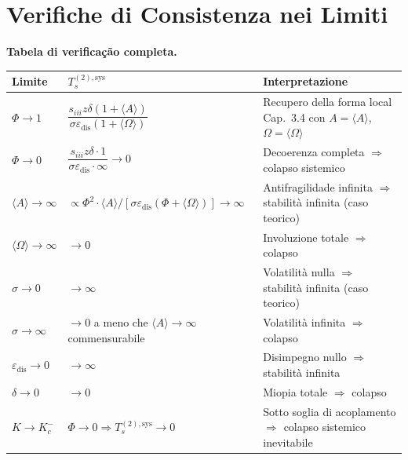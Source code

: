 \section{Verifiche di Consistenza nei
Limiti}\label{verifiche-di-consistenza-nei-limiti}

\Proved{} \textbf{Tabela di verificação completa.}

{\def\LTcaptype{none} %
{\small\begin{longtable}[]{@{}
  >{\raggedright\arraybackslash}p{}
  >{\raggedright\arraybackslash}p{}
  >{\raggedright\arraybackslash}p{}@{}}
\toprule\noalign{}
\begin{minipage}[b]{\linewidth}\raggedright
Limite
\end{minipage} & \begin{minipage}[b]{\linewidth}\raggedright
\(T_s^{(2),\text{sys}}\)
\end{minipage} & \begin{minipage}[b]{\linewidth}\raggedright
Interpretazione
\end{minipage} \\
\midrule\noalign{}
\endhead
\bottomrule\noalign{}
\endlastfoot
\(\Phi \to 1\) &
\(\dfrac{s_{iii}z\delta(1+\langle A\rangle)}{\sigma\varepsilon_{\text{dis}}(1+\langle\Omega\rangle)}\)
& Recupero della forma local Cap.~3.4 con \(A=\langle A\rangle\),
\(\Omega=\langle\Omega\rangle\) \Proved{} \\
\(\Phi \to 0\) &
\(\dfrac{s_{iii}z\delta \cdot 1}{\sigma\varepsilon_{\text{dis}} \cdot \infty} \to 0\)
& Decoerenza completa \(\Rightarrow\) colapso sistemico \Proved{} \\
\(\langle A\rangle \to \infty\) &
\(\propto \Phi^2 \cdot \langle A\rangle / [\sigma\varepsilon_{\text{dis}}(\Phi+\langle\Omega\rangle)] \to \infty\)
& Antifragilidade infinita \(\Rightarrow\) stabilità infinita (caso
teorico) \Proved{} \\
\(\langle\Omega\rangle \to \infty\) & \(\to 0\) & Involuzione totale
\(\Rightarrow\) colapso \Proved{} \\
\(\sigma \to 0\) & \(\to \infty\) & Volatilità nulla \(\Rightarrow\)
stabilità infinita (caso teorico) \Proved{} \\
\(\sigma \to \infty\) & \(\to 0\) a meno che
\(\langle A\rangle \to \infty\) commensurabile & Volatilità infinita
\(\Rightarrow\) colapso \Proved{} \\
\(\varepsilon_{\text{dis}} \to 0\) & \(\to \infty\) & Disimpegno nullo
\(\Rightarrow\) stabilità infinita \Proved{} \\
\(\delta \to 0\) & \(\to 0\) & Miopia totale \(\Rightarrow\) colapso
\Proved{} \\
\(K \to K_c^-\) & \(\Phi \to 0 \Rightarrow T_s^{(2),\text{sys}} \to 0\)
& Sotto soglia di acoplamento \(\Rightarrow\) colapso sistemico
inevitabile \Proved{} \\
\end{longtable}}
}

